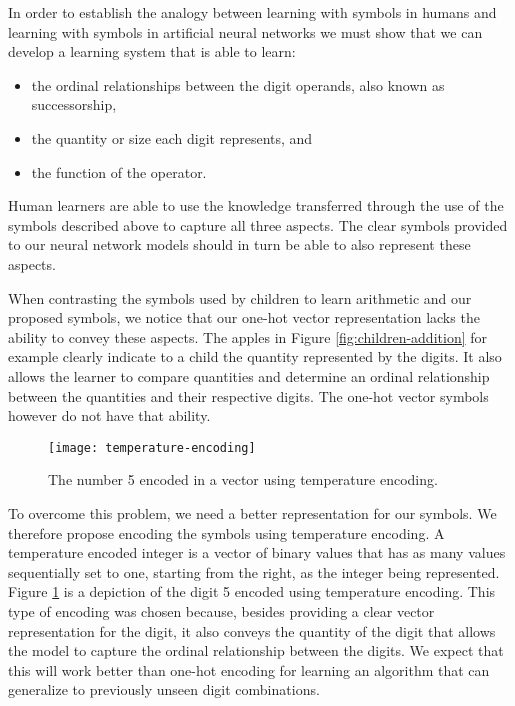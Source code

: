 In order to establish the analogy between learning with symbols in humans and learning with symbols in artificial neural networks we must show that we can develop a learning system that is able to learn:
\begin{itemize}
	\item the ordinal relationships between the digit operands, also known as successorship,
	\item the quantity or size each digit represents, and
	\item the function of the operator.
\end{itemize}
Human learners are able to use the knowledge transferred through the use of the symbols described above to capture all three aspects. The clear symbols provided to our neural network models should in turn be able to also represent these aspects\cite{wiki:Elementary_arithmetic}. 

When contrasting the symbols used by children to learn arithmetic and our proposed symbols, we notice that our one-hot vector representation lacks the ability to convey these aspects. The apples in Figure \ref{fig:children-addition} for example clearly indicate to a child the quantity represented by the digits. It also allows the learner to compare quantities and determine an ordinal relationship between the quantities and their respective digits. The one-hot vector symbols however do not have that ability.

\begin{figure}[t]
	\centering
	\texttt{[image: temperature-encoding]}
	\caption{The number 5 encoded in a vector using temperature encoding.}
	\label{fig:temperature-encoding}
\end{figure}

To overcome this problem, we need a better representation for our symbols. We therefore propose encoding the symbols using temperature encoding. A temperature encoded integer is a vector of binary values that has as many values sequentially set to one, starting from the right, as the integer being represented. Figure \ref{fig:temperature-encoding} is a depiction of the digit 5 encoded using temperature encoding. This type of encoding was chosen because, besides providing a clear vector representation for the digit, it also conveys the quantity of the digit that allows the model to capture the ordinal relationship between the digits. We expect that this will work better than one-hot encoding for learning an algorithm that can generalize to previously unseen digit combinations.
